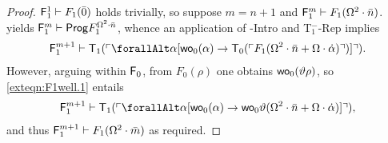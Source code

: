 \documentclass[UKenglish,cleveref,DIV=12]{scrartcl}
\let\forall\forallAlt
\theoremstyle{definition}
\theoremstyle{definition}
\begin{document}
\begin{proof}
$\mathsf{F}_1^1\vdash F_1(\bar 0)$ holds trivially, so suppose $m=n+1$ and $\mathsf{F}_1^m\vdash F_1(\Omega^2\cdot\bar n)$.
 yields $\mathsf{F}_1^m\vdash \mathsf{Prog}  F_1^{\Omega^2\cdot\bar n}$, whence an application of -Intro and T$^-_1$-Rep implies
\begin{align}\label{exteqn:F1well.1}
  \F_1^{m+1}\proves \T_1(\gn{\forall\alpha[\wo_0(\alpha)\rightarrow \T_0(\gn{F_1(\Omega^2\cdot\bar n+\Omega\cdot\dot\alpha)})]}).
\end{align}
However, arguing within $\mathsf{F}_0$, from $F_0(\rho)$ one obtains $\mathsf{wo}_0(\vartheta\rho)$, so \cref{exteqn:F1well.1} entails
\begin{align*}
  \F_1^{m+1}\proves \T_1(\gn{\forall\alpha[\wo_0(\alpha)\rightarrow \wo_0\vartheta(\Omega^2\cdot\bar n+\Omega\cdot \dot\alpha)]}),
\end{align*}
and thus $\mathsf{F}_1^{m+1}\vdash F_1(\Omega^2\cdot\bar m)$ as required.
\end{proof}
\end{document}
